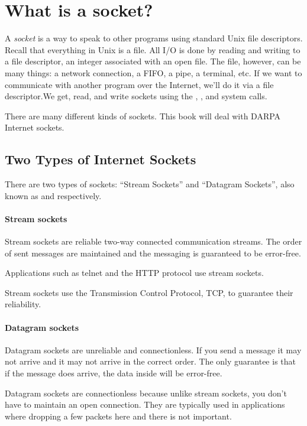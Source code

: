 \section{What is a socket?}
A \emph{socket} is a way to speak to other programs using standard Unix file descriptors. Recall that everything in Unix is a file. All I/O is done by reading and writing to a file descriptor, an integer associated with an open file. The file, however, can be many things: a network connection, a FIFO, a pipe, a terminal, etc. If we want to communicate with another program over the Internet, we'll do it via a file descriptor.We get, read, and write sockets using the , , and  system calls. 

There are many different kinds of sockets. This book will deal with DARPA Internet sockets. 

\subsection{Two Types of Internet Sockets}
There are two types of sockets: ``Stream Sockets'' and ``Datagram Sockets'', also known as  and  respectively. 

\paragraph{Stream sockets}
Stream sockets are reliable two-way connected communication streams. The order of sent messages are maintained and the messaging is guaranteed to be error-free.

Applications such as telnet and the HTTP protocol use stream sockets.

Stream sockets use the Transmission Control Protocol, TCP, to guarantee their reliability. 

\paragraph{Datagram sockets}
Datagram sockets are unreliable and connectionless. If you send a message it may not arrive and it may not arrive in the correct order. The only guarantee is that if the message does arrive, the data inside will be error-free.

Datagram sockets are connectionless because unlike stream sockets, you don't have to maintain an open connection. They are typically used in applications where dropping a few packets here and there is not important. 

